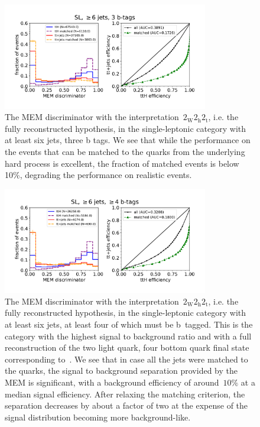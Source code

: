 \begin{figure}[ht]
\begin{centering}
\includegraphics[width = 0.8\textwidth]{figures/mem/mem_sl_jge6_t3.pdf}
\caption[MEM with the $2_{\mathrm{W}} 2_{\mathrm{h}} 2_{\mathrm{t}}$ interpretation in the $\ge6$ jet, 3~b tag category]{The MEM discriminator with the interpretation~$2_{\mathrm{W}} 2_{\mathrm{h}} 2_{\mathrm{t}}$, i.e. the fully reconstructed hypothesis, in the single-leptonic category with at least six jets, three b tags. We see that while the performance on the events that can be matched to the quarks from the underlying hard process is excellent, the fraction of matched events is below 10\%, degrading the performance on realistic events.}
\label{fig:mem_sl_jge6_t3}
\end{centering}
\end{figure}

\begin{figure}[ht]
\begin{centering}
\includegraphics[width = 0.8\textwidth]{figures/mem/mem_sl_jge6_tge4.pdf}
\caption[MEM with the~$2_{\mathrm{W}} 2_{\mathrm{h}} 2_{\mathrm{t}}$ interpretation in the $\ge6$ jet, $\ge4$ b~tag category]{The MEM discriminator with the interpretation~$2_{\mathrm{W}} 2_{\mathrm{h}} 2_{\mathrm{t}}$, i.e. the fully reconstructed hypothesis, in the single-leptonic category with at least six jets, at least four of which must be b~tagged. This is the category with the highest signal to background ratio and with a full reconstruction of the two light quark, four bottom quark final state corresponding to~\ttHbb. We see that in case all the jets were matched to the quarks, the signal to background separation provided by the MEM is significant, with a background efficiency of around~$10\%$ at a median signal efficiency. After relaxing the matching criterion, the separation decreases by about a factor of two at the expense of the signal distribution becoming more background-like.}
\label{fig:mem_sl_jge6_tge4}
\end{centering}
\end{figure}

